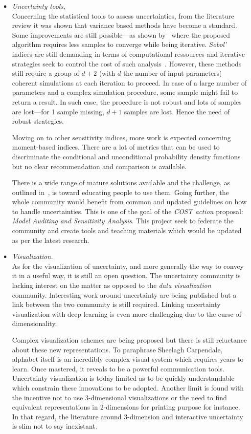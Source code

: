 \begin{itemize}
\item \emph{Uncertainty tools,}\hfill\\
Concerning the statistical tools to assess uncertainties, from the literature review it was shown that variance based methods have become a standard. Some improvements are still possible---as shown by~\cite{Saltelli2017} where the proposed algorithm requires less samples to converge while being iterative. \emph{Sobol'} indices are still demanding in terms of computational ressources and iterative strategies seek to control the cost of such analysis~\cite{Terraz2017}. However, these methods still require a group of $d + 2$ (with $d$ the number of input parameters) coherent simulations at each iteration to proceed. In case of a large number of parameters and a complex simulation procedure, some sample might fail to return a result. In such case, the procedure is not robust and lots of samples are lost---for 1 sample missing, $d + 1$ samples are lost. Hence the need of robust strategies.

Moving on to other sensitivity indices, more work is expected concerning moment-based indices. There are a lot of metrics that can be used to discriminate the conditional and unconditional probability density functions but no clear recommendation and comparison is available.

There is a wide range of mature solutions available and the challenge, as outlined in~\cite{Saltelli2019}, is toward educating people to use them. Going further, the whole community would benefit from common and updated guidelines on how to handle uncertainties. This is one of the goal of the \emph{COST action} proposal: \emph{Model Auditing and Sensitivity Analysis}. This project seek to federate the community and create tools and teaching materials which would be updated as per the latest research.

\item \emph{Visualization.}\hfill\\
As for the visualization of uncertainty, and more generally the way to convey it in a useful way, it is still an open question. The uncertainty community is lacking interest on the matter as opposed to the \emph{data visualization} community. Interesting work around uncertainty are being published but a link between the two community is still required. Linking uncertainty visualization with deep learning is even more challenging due to the curse-of-dimensionality.

Complex visualization schemes are being proposed but there is still reluctance about these new representations. To paraphrase Sheelagh Carpendale, alphabet itself is an incredibly complex visual system which requires years to learn. Once mastered, it reveals to be a powerful communication tools. Uncertainty visualization is today limited as to be quickly understandable which constrain these innovations to be adopted. Another limit is found with the incentive not to use 3-dimensional visualizations or the need to find equivalent representations in 2-dimensions for printing purpose for instance. In that regard, the literature around 3-dimension and interactive uncertainty is slim not to say inexistant.
\end{itemize}

